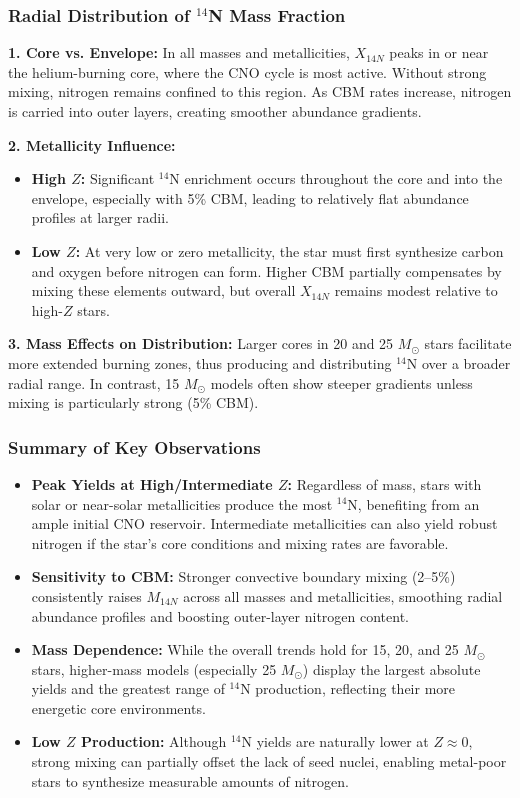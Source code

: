 \subsubsection{Radial Distribution of $^{14}$N Mass Fraction}

\textbf{1. Core vs. Envelope:}  
In all masses and metallicities, $X_{14N}$ peaks in or near the helium-burning core, where the CNO cycle is most active. Without strong mixing, nitrogen remains confined to this region. As CBM rates increase, nitrogen is carried into outer layers, creating smoother abundance gradients.

\textbf{2. Metallicity Influence:}  
\begin{itemize}
    \item \textbf{High $Z$:} 
    Significant $^{14}$N enrichment occurs throughout the core and into the envelope, especially with 5\% CBM, leading to relatively flat abundance profiles at larger radii.
    \item \textbf{Low $Z$:} 
    At very low or zero metallicity, the star must first synthesize carbon and oxygen before nitrogen can form. Higher CBM partially compensates by mixing these elements outward, but overall $X_{14N}$ remains modest relative to high-$Z$ stars.
\end{itemize}

\textbf{3. Mass Effects on Distribution:}  
Larger cores in 20 and 25 $M_\odot$ stars facilitate more extended burning zones, thus producing and distributing $^{14}$N over a broader radial range. In contrast, 15 $M_\odot$ models often show steeper gradients unless mixing is particularly strong (5\% CBM).

\subsubsection{Summary of Key Observations}

\begin{itemize}
    \item \textbf{Peak Yields at High/Intermediate $Z$:} 
    Regardless of mass, stars with solar or near-solar metallicities produce the most $^{14}$N, benefiting from an ample initial CNO reservoir. Intermediate metallicities can also yield robust nitrogen if the star’s core conditions and mixing rates are favorable.
    \item \textbf{Sensitivity to CBM:} 
    Stronger convective boundary mixing (2--5\%) consistently raises $M_{14N}$ across all masses and metallicities, smoothing radial abundance profiles and boosting outer-layer nitrogen content.
    \item \textbf{Mass Dependence:} 
    While the overall trends hold for 15, 20, and 25 $M_\odot$ stars, higher-mass models (especially 25 $M_\odot$) display the largest absolute yields and the greatest range of $^{14}$N production, reflecting their more energetic core environments.
    \item \textbf{Low $Z$ Production:} 
    Although $^{14}$N yields are naturally lower at $Z \approx 0$, strong mixing can partially offset the lack of seed nuclei, enabling metal-poor stars to synthesize measurable amounts of nitrogen.
\end{itemize}

